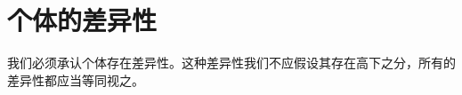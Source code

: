 \documentclass[main.tex]{subfiles}
\begin{document}
\section{个体的差异性}
我们必须承认个体存在差异性。这种差异性我们不应假设其存在高下之分，所有的差异性都应当等同视之。
\end{document}

